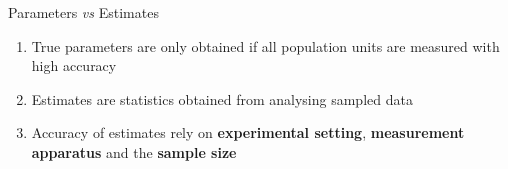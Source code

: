 \documentclass{beamer}
\begin{document}
\begin{frame}{Parameters \textit{vs} Estimates}
\begin{enumerate}
  
  \item<1-> True parameters are only obtained if all population units are measured with high accuracy
   
  \vspace{0.2cm}   
 
  
  \item<2-> Estimates are statistics obtained from analysing sampled data
  
  \vspace{0.2cm} 
  
  
  \item<3-> Accuracy of estimates rely on \textbf{experimental setting}, \textbf{measurement apparatus} and the \textbf{sample size}
     
  \vspace{0.2cm}
    	
\end{enumerate}    
\end{frame}

\end{document}
